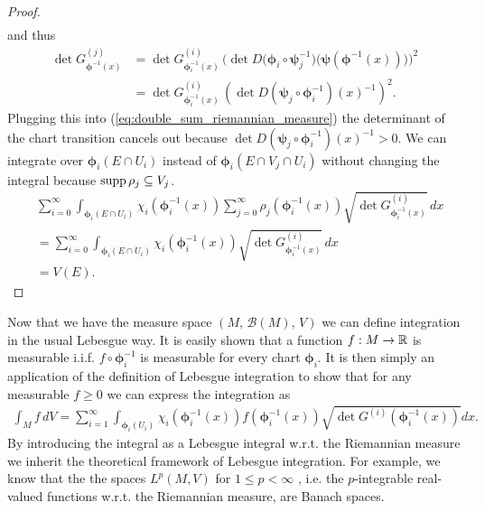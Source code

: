 \documentclass[../master_thesis.tex]{subfiles}
\begin{document}
\begin{proof}
\begin{align*}
    \end{align*}
    and thus 
    \begin{align*}
        \det G^{(j)}_{\boldsymbol{\phi}^{-1}(x)} 
        &= \det G^{(i)}_{\boldsymbol{\phi}_i^{-1}(x)} \,
            \bigg(\det D\big(\boldsymbol{\phi}_i \circ \boldsymbol{\psi}_j^{-1}\big)\big(\boldsymbol{\psi}(\boldsymbol{\phi}^{-1}(x))\big)\bigg)^2
        \\ &= \det G^{(i)}_{\boldsymbol{\phi}_i^{-1}(x)} \,
            \left( \det D(\boldsymbol{\psi}_j \circ \bm{\phi}_i^{-1})(x)^{-1}\right)^2.
    \end{align*}
    Plugging this into (\ref{eq:double_sum_riemannian_measure}) the determinant 
    of the chart transition cancels out because $\det D(\boldsymbol{\psi}_j \circ \boldsymbol{\phi}_i^{-1})(x)^{-1} > 0$.
    We can integrate over $\boldsymbol{\phi}_i(E \cap U_i)$ 
    instead of $\boldsymbol{\phi}_i(E \cap V_j \cap U_i)$ without changing the integral 
    because $\operatorname{supp} \rho_j \subseteq V_j$.
    \begin{align*}
        &\sum_{i=0}^\infty \int_{\boldsymbol{\phi}_i(E \cap U_i)} \chi_i(\boldsymbol{\phi}_i^{-1}(x))\sum_{j=0}^\infty \rho_j(\boldsymbol{\phi}_i^{-1}(x))
            \sqrt{\det G^{(i)}_{\boldsymbol{\phi}_i^{-1}(x)}} \, dx
        \\ &= \sum_{i=0}^\infty \int_{\boldsymbol{\phi}_i(E \cap U_i)} \chi_i(\boldsymbol{\phi}_i^{-1}(x))
             \sqrt{\det G^{(i)}_{\boldsymbol{\phi}_i^{-1}(x)}} \, dx
        \\ &= V(E).
    \end{align*}
\end{proof}


Now that we have the measure space $(M, \, \mathcal{B}(M), \, V)$
we can define integration in the usual Lebesgue way.
It is easily shown that a function $f: M \rightarrow \mathbb{R}$ is measurable 
i.i.f. $f \circ \boldsymbol{\phi}_i^{-1}$ is measurable for every chart $\boldsymbol{\phi}_i$. 
It is then simply an application of the definition of Lebesgue integration to
show that for any measurable $f \geq 0$ we can express the integration as
\begin{align*}
    \int_M f \, dV = \sum\limits_{i=1}^\infty \int_{\boldsymbol{\phi}_i(U_i)} 
        \chi_i(\boldsymbol{\phi}_i^{-1}(x)) f(\boldsymbol{\phi}_i^{-1}(x)) 
        \sqrt{\det G^{(i)}(\boldsymbol{\phi}_i^{-1}(x))} dx.
\end{align*}
By introducing the integral as a Lebesgue integral w.r.t. the Riemannian 
measure we inherit the theoretical framework of Lebesgue integration. 
For example, we know that the the spaces $L^p(M,V)$ for $1\leq p < \infty$
, i.e. the $p$-integrable 
real-valued functions w.r.t. the Riemannian measure, are Banach spaces.
\end{document}
